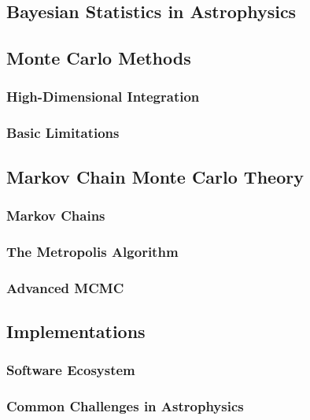 \documentclass[preprint2,longauthor]{aastex631}
\begin{document}
\subsection{Bayesian Statistics in Astrophysics}

\subsection{Monte Carlo Methods}
\subsubsection{High-Dimensional Integration}
\subsubsection{Basic Limitations}

\subsection{Markov Chain Monte Carlo Theory}
\subsubsection{Markov Chains}
\subsubsection{The Metropolis Algorithm}
\subsubsection{Advanced MCMC}

\subsection{Implementations}
\subsubsection{Software Ecosystem}
\subsubsection{Common Challenges in Astrophysics}




\end{document}
